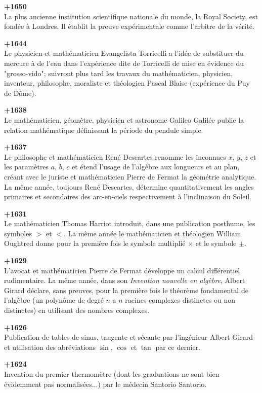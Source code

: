 \textbf{+1650}\\
La plus ancienne institution scientifique nationale du monde, la Royal Society, est fondée à Londres. Il établit la preuve expérimentale comme l'arbitre de la vérité.

\textbf{+1644}\\
Le physicien et mathématicien Evangelista Torricelli a l'idée de substituer du mercure à de l'eau dans l'expérience dite de Torricelli de mise en évidence du "grosso-vido"; suivront plus tard les travaux du mathématicien, physicien, inventeur, philosophe, moraliste et théologien Pascal Blaise (expérience du Puy de Dôme).

\textbf{+1638}\\
Le mathématicien, géomètre, physicien et astronome Galileo Galilée publie la relation mathématique définissant la période du pendule simple.

\textbf{+1637}\\
Le philosophe et mathématicien René Descartes renomme les inconnues $x$, $y$, $z$ et les paramètres $a$, $b$, $c$ et étend l'usage de l'algèbre aux longueurs et au plan, créant avec le juriste et mathématicien Pierre de Fermat la géométrie analytique. La même année, toujours René Descartes, détermine quantitativement les angles primaires et secondaires des arc-en-ciels respectivement à l'inclinaison du Soleil.

\textbf{+1631}\\
Le mathématicien Thomas Harriot introduit, dans une publication posthume, les symboles $>$ et $<$. La même année le mathématicien et théologien William Oughtred donne pour la première fois le symbole multiplié $\times$ et le symbole $\pm$.

\textbf{+1629}\\
L'avocat et mathématicien Pierre de Fermat développe un calcul différentiel rudimentaire. La même année, dans son \textit{Invention nouvelle en algèbre}, Albert Girard déclare, sans preuves, pour la première fois le théorème fondamental de l'algèbre (un polynôme de degré $ n $ a $ n $ racines complexes distinctes ou non distinctes) en utilisant des nombres complexes.

\textbf{+1626}\\
Publication de tables de sinus, tangente et sécante par l'ingénieur Albert Girard et utilisation des abréviations $\sin$, $\cos$ et $\tan$ par ce dernier.

\textbf{+1624}\\
Invention du premier thermomètre (dont les graduations ne sont bien évidemment pas normalisées...) par le médecin Santorio Santorio.

